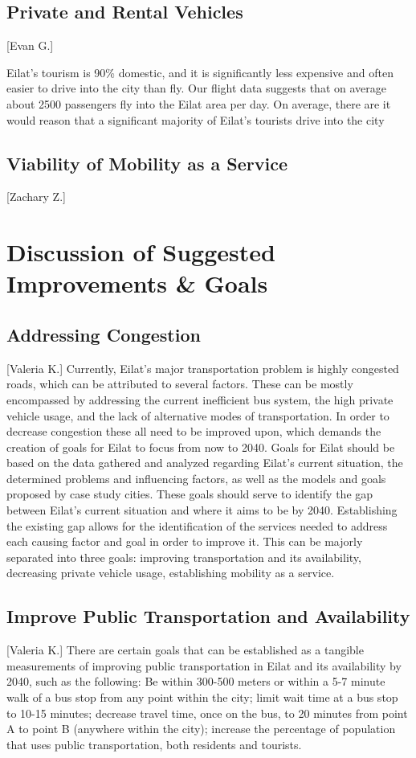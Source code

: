\documentclass[12pt]{article}                       %
\begin{document}
\subsection{Private and Rental Vehicles}[Evan G.]

Eilat's tourism is 90\% domestic, and it is significantly less expensive and often easier to drive into the city than fly. Our flight data suggests that on average about 2500 passengers fly into the Eilat area per day. On average, there are it would reason that a significant majority of Eilat's tourists drive into the city

\subsection{Viability of Mobility as a Service}[Zachary Z.]

\newpage
\section{Discussion of Suggested Improvements \& Goals}
\subsection{Addressing Congestion}[Valeria K.]
Currently, Eilat's major transportation problem is highly congested roads, which can be attributed to several factors. These can be mostly encompassed by addressing the current inefficient bus system, the high private vehicle usage, and the lack of alternative modes of transportation. In order to decrease congestion these all need to be improved upon, which demands the creation of goals for Eilat to focus from now to 2040. Goals for Eilat should be based on the data gathered and analyzed regarding Eilat's current situation, the determined problems and influencing factors, as well as the models and goals proposed by case study cities. These goals should serve to identify the gap between Eilat's current situation and where it aims to be by 2040. Establishing the existing gap allows for the identification of the services needed to address each causing factor and goal in order to improve it. This can be majorly separated into three goals: improving transportation and its availability, decreasing private vehicle usage,  establishing mobility as a service. 

\subsection{Improve Public Transportation and Availability}[Valeria K.] \label{sec:disc_improve_transport}
There are certain goals that can be established as a tangible measurements of improving public transportation in Eilat and its availability by 2040, such as the following: Be within 300-500 meters or within a 5-7 minute walk of a bus stop from any point within the city; limit wait time at a bus stop to 10-15 minutes; decrease travel time, once on the bus, to 20 minutes from point A to point B (anywhere within the city); increase the percentage of population that uses public transportation, both residents and tourists.
\end{document}
